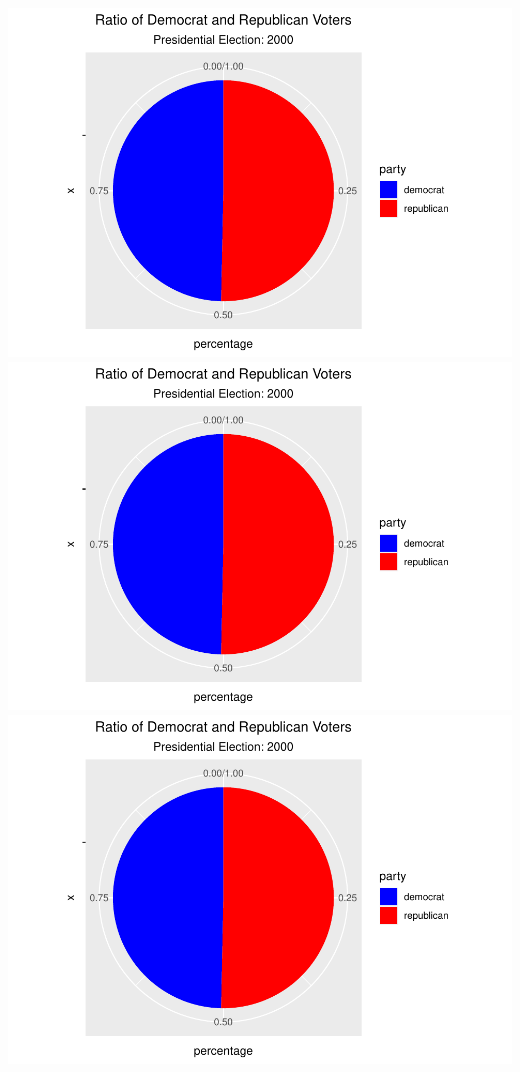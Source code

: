 \documentclass[
]{article}
\begin{document}
\includegraphics{election_files/figure-latex/anim-58.pdf}
\includegraphics{election_files/figure-latex/anim-59.pdf}
\includegraphics{election_files/figure-latex/anim-60.pdf}
\end{document}
